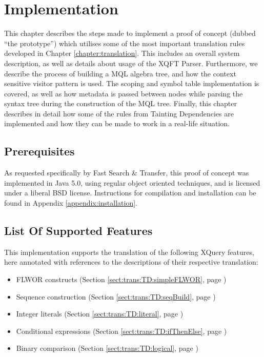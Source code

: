 \chapter{Implementation}
\label{chapter:implementation}
This chapter describes the steps made to implement a proof of concept (dubbed
``the prototype'') which utilises some of the most important translation
rules developed in Chapter \ref{chapter:translation}. This includes an overall system
description, as well as details about usage of the XQFT Parser. Furthermore, we
describe the process of building a MQL algebra tree, and how the context
sensitive visitor pattern is used. The scoping and symbol table implementation
is covered, as well as how metadata is passed between nodes while parsing the
syntax tree during the construction of the MQL tree. Finally, this chapter describes in
detail how some of the rules from Tainting Dependencies are
implemented and how they can be made to work in a real-life situation.

\section{Prerequisites}
As requested specifically by Fast Search \& Transfer, this proof of concept was implemented
in Java 5.0, using regular object oriented techniques, and is licensed under a
liberal BSD license. Instructions for compilation and installation can be
found in Appendix \ref{appendix:installation}.

\section{List Of Supported Features}
This implementation supports the translation of the following XQuery features,
here annotated with references to the descriptions of their respective
translation:
\begin{itemize}
  \item FLWOR constructs (Section \ref{sect:trans:TD:simpleFLWOR}, page
  \pageref{sect:trans:TD:simpleFLWOR})
  \item Sequence construction (Section \ref{sect:trans:TD:seqBuild}, page
  \pageref{sect:trans:TD:seqBuild})
  \item Integer literals (Section \ref{sect:trans:TD:literal}, page
  \pageref{sect:trans:TD:literal})
  \item Conditional expressions (Section \ref{sect:trans:TD:ifThenElse}, page
  \pageref{sect:trans:TD:ifThenElse})
  \item Binary comparison (Section \ref{sect:trans:TD:logical}, page
  \pageref{sect:trans:TD:logical})
\end{itemize}

